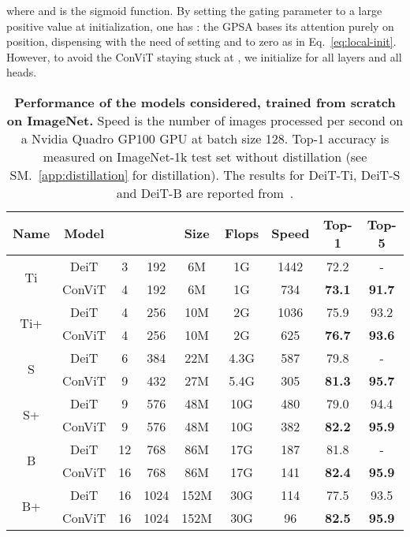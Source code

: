 where  and  is the sigmoid function. By setting the gating parameter  to a large positive value at initialization, one has  : the GPSA bases its attention purely on position, dispensing with the need of setting  and  to zero as in Eq.~\ref{eq:local-init}. However, to avoid the ConViT staying stuck at , we initialize  for all layers and all heads.

\begin{table*}[tb]
    \centering
    \begin{tabular}{c|c|c|c|c|c|c|c|c}
    \toprule
    Name & Model &  &  & Size & Flops & Speed & Top-1 & Top-5\\
    \midrule
    \multirow{2}{*}{Ti} & DeiT & 3 & 192 & 6M & 1G & 1442 & 72.2 & -\\
       & ConViT       & 4 & 192 & 6M & 1G & 734 & \textbf{73.1} & \textbf{91.7}\\
    \hline
    \multirow{2}{*}{Ti+} & DeiT   & 4 & 256 & 10M & 2G & 1036 & 75.9 & 93.2 \\
    & ConViT & 4 & 256 & 10M & 2G & 625 & \textbf{76.7} & \textbf{93.6}\\
    \hline
    \multirow{2}{*}{S} & DeiT & 6 & 384 & 22M & 4.3G & 587  & 79.8 & -\\
    & ConViT       & 9 & 432 & 27M & 5.4G & 305 & \textbf{81.3} & \textbf{95.7}\\
    \hline
    \multirow{2}{*}{S+} & DeiT   & 9 & 576 & 48M & 10G & 480 & 79.0 & 94.4\\
    & ConViT & 9 & 576 & 48M & 10G & 382 & \textbf{82.2} & \textbf{95.9}\\
    \hline
    \multirow{2}{*}{B} & DeiT & 12 & 768 & 86M & 17G & 187 & 81.8 & -\\
    & ConViT       & 16 & 768 & 86M & 17G & 141 & \textbf{82.4} & \textbf{95.9}\\
    \hline
    \multirow{2}{*}{B+} & DeiT   & 16 & 1024 & 152M & 30G & 114 & 77.5 & 93.5\\
    & ConViT & 16 & 1024 & 152M & 30G & 96 & \textbf{82.5} & \textbf{95.9}\\
    \bottomrule
    \end{tabular}
    \caption{\textbf{Performance of the models considered, trained from scratch on ImageNet.} Speed is the number of images processed per second on a Nvidia Quadro GP100 GPU at batch size 128. Top-1 accuracy is measured on ImageNet-1k test set without distillation (see SM.~\ref{app:distillation} for distillation). The results for DeiT-Ti, DeiT-S and DeiT-B are reported from~\cite{touvron2020training}.
    }
    \label{tab:statistics}
\end{table*}

